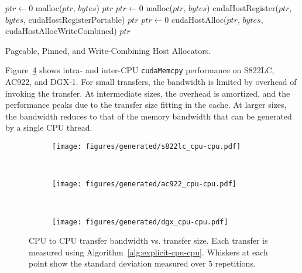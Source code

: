 \begin{algorithm}[H]
	\begin{algorithmic}[1]
		\Statex
		\State $ptr \gets 0$
		\State malloc($ptr$, $bytes$)
		\Return $ptr$
		\EndFunction
		\Statex
		\State $ptr \gets 0$
		\State malloc($ptr$, $bytes$)
		\State cudaHostRegister($ptr$, $bytes$, cudaHostRegisterPortable)
		\Return $ptr$
		\EndFunction
		\Statex
		\State $ptr \gets 0$
		\State cudaHostAlloc($ptr$, $bytes$, cudaHostAllocWriteCombined)
		\Return $ptr$
		\EndFunction
		
	\end{algorithmic}
	\caption[Pageable, Pinned, and Write-Combining Host Allocators.]{
        Pageable, Pinned, and Write-Combining Host Allocators.
	}
	\label{alg:host-allocators}
\end{algorithm}

Figure~\ref{fig:explicit-cpu-cpu} shows intra- and inter-CPU \texttt{cudaMemcpy} performance on S822LC, AC922, and DGX-1.
For small transfers, the bandwidth is limited by overhead of invoking the transfer.
At intermediate sizes, the overhead is amortized, and the performance peaks due to the transfer size fitting in the cache.
At larger sizes, the bandwidth reduces to that of the memory bandwidth that can be generated by a single CPU thread.

\begin{figure}[H]
	\centering
	\begin{subfigure}[b]{0.31\textwidth}
		\texttt{[image: figures/generated/s822lc\_cpu-cpu.pdf]}
		\caption{}
		\label{fig:s822lc-cpu0-cpu1-dst}
	\end{subfigure}
	~
	\begin{subfigure}[b]{0.31\textwidth}
		\texttt{[image: figures/generated/ac922\_cpu-cpu.pdf]}
		\caption{}
		\label{fig:ac922-cpu0-cpu1-dst}
	\end{subfigure}
	~
	\begin{subfigure}[b]{0.31\textwidth}
		\texttt{[image: figures/generated/dgx\_cpu-cpu.pdf]}
		\caption{}
		\label{fig:dgx-cpu0-cpu1-dst}
	\end{subfigure}
	\caption[CPU to CPU transfer bandwidth]{
		CPU to CPU transfer bandwidth vs. transfer size.
		Each transfer is measured using Algorithm~\ref{alg:explicit-cpu-cpu}.
		Whiskers at each point show the standard deviation measured over 5 repetitions.
	}
	\label{fig:explicit-cpu-cpu}
\end{figure}


